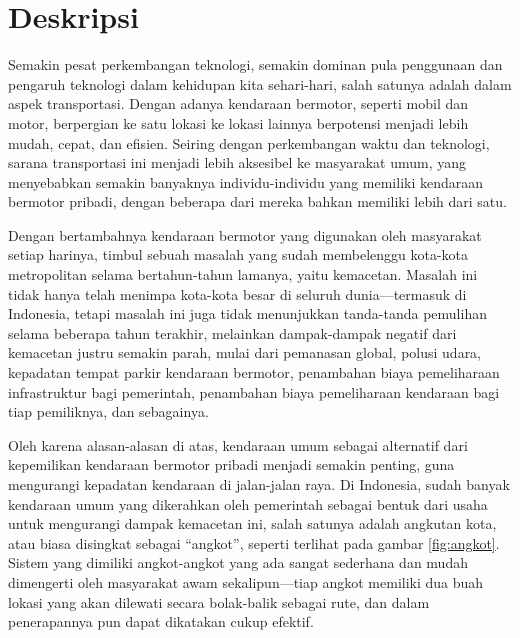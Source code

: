 \documentclass[a4paper,twoside]{article}
\begin{document}
\title{\@judultopik}
\author{\nama \textendash \@npm} 

\newcommand{\nama}{Alfred Aprianto Liaunardi}
\newcommand{\@npm}{6181801014}
\newcommand{\@judultopik}{Perkakas Command Line KIRI} %
\newcommand{\jumpemb}{1} %
\newcommand{\tanggal}{17/03/2022}


\maketitle


\section{Deskripsi}
Semakin pesat perkembangan teknologi, semakin dominan pula penggunaan dan pengaruh teknologi dalam kehidupan kita sehari-hari, salah satunya adalah dalam aspek transportasi. Dengan adanya kendaraan bermotor, seperti mobil dan motor, berpergian ke satu lokasi ke lokasi lainnya berpotensi menjadi lebih mudah, cepat, dan efisien. Seiring dengan perkembangan waktu dan teknologi, sarana transportasi ini menjadi lebih aksesibel ke masyarakat umum, yang menyebabkan semakin banyaknya individu-individu yang memiliki kendaraan bermotor pribadi, dengan beberapa dari mereka bahkan memiliki lebih dari satu.

Dengan bertambahnya kendaraan bermotor yang digunakan oleh masyarakat setiap harinya, timbul \mbox{sebuah} masalah yang sudah membelenggu kota-kota metropolitan selama bertahun-tahun lamanya, yaitu \mbox{kemacetan}. Masalah ini tidak hanya telah menimpa kota-kota besar di seluruh dunia---termasuk di Indonesia, tetapi masalah ini juga tidak menunjukkan tanda-tanda pemulihan selama beberapa tahun terakhir, melainkan dampak-dampak negatif dari kemacetan justru semakin parah, mulai dari pemanasan global, polusi udara, kepadatan tempat parkir kendaraan bermotor, penambahan biaya pemeliharaan infrastruktur bagi pemerintah, penambahan biaya pemeliharaan kendaraan bagi tiap pemiliknya, dan sebagainya.

Oleh karena alasan-alasan di atas, kendaraan umum sebagai alternatif dari kepemilikan kendaraan bermotor pribadi menjadi semakin penting, guna mengurangi kepadatan kendaraan di jalan-jalan raya. Di Indonesia, sudah banyak kendaraan umum yang dikerahkan oleh pemerintah sebagai bentuk dari usaha untuk mengurangi dampak kemacetan ini, salah satunya adalah angkutan kota, atau biasa disingkat sebagai ``angkot'', seperti terlihat pada gambar \ref{fig:angkot}. Sistem yang dimiliki angkot-angkot yang ada sangat sederhana dan mudah dimengerti oleh masyarakat awam sekalipun---tiap angkot memiliki dua buah lokasi yang akan dilewati secara bolak-balik sebagai rute, dan dalam penerapannya pun dapat dikatakan cukup efektif. 
\end{document}
